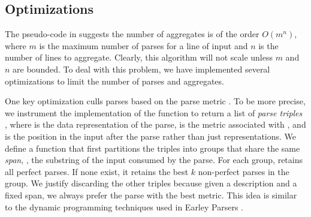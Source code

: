 
\subsection{Optimizations}\label{sec:opt}
The pseudo-code in  suggests the number of
aggregates is of the order $O(m ^ n)$, where $m$ is the maximum number of
parses for a line of input  and $n$ is the number of lines to
aggregate.  Clearly, this algorithm will not scale 
unless $m$ and $n$ are bounded.  To deal with this problem,
we have implemented several optimizations to limit the number of 
parses and aggregates. 

One key optimization culls parses based on 
the parse metric . 
To be more precise, we instrument the implementation of the  function 
to return a list of 
{\em parse triples} , where  is the data representation of
the parse,  is the metric associated with , and
 is the position in the input after the parse rather than just representations.
We define a  function that first partitions the
triples into groups that share the same 
{\em span}, \ie{}, the substring of the input consumed by the parse.
For each group,  retains all perfect parses. If 
none exist, it retains the best $k$ non-perfect parses in the group. 
We justify discarding the other triples because
given a description  and a fixed span, we always
prefer the parse with the best metric. This idea is
similar to the dynamic programming techniques used in 
Earley Parsers \cite{earley-parser}. 

